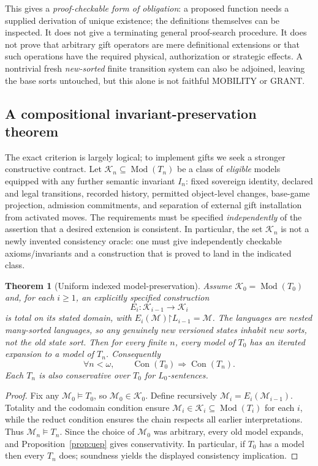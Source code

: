 \documentclass[11pt,letterpaper]{article}
\newtheorem{theorem}{Theorem}[section]
\theoremstyle{definition}
\newcommand{\Con}{\operatorname{Con}}
\newcommand{\Mod}{\operatorname{Mod}}
\newcommand{\restr}{\mathord{\upharpoonright}}
\begin{document}
\noindent This gives a \emph{proof-checkable form of obligation}: a proposed function needs a supplied derivation of unique existence; the definitions themselves can be inspected. It does not give a terminating general proof-search procedure. It does not prove that arbitrary gift operators are mere definitional extensions or that such operations have the required physical, authorization or strategic effects. A nontrivial fresh \emph{new-sorted} finite transition system can also be adjoined, leaving the base sorts untouched, but this alone is not faithful MOBILITY or GRANT.

\subsection{A compositional invariant-preservation theorem}

The exact criterion is largely logical; to implement gifts we seek a stronger constructive contract. Let \(\mathcal K_n\subseteq\Mod(T_n)\) be a class of \emph{eligible} models equipped with any further semantic invariant \(I_n\): fixed sovereign identity, declared and legal transitions, recorded history, permitted object-level changes, base-game projection, admission commitments, and separation of external gift installation from activated moves. The requirements must be specified \emph{independently} of the assertion that a desired extension is consistent. In particular, the set $\mathcal K_n$ is not a newly invented consistency oracle: one must give independently checkable axioms/invariants and a construction that is proved to land in the indicated class.

\begin{theorem}[Uniform indexed model-preservation]\label{thm:indexed}
Assume \(\mathcal K_0=\Mod(T_0)\) and, for each \(i\geq1\), an explicitly specified construction
\[
E_i:\mathcal K_{i-1}\longrightarrow\mathcal K_i
\]
is total on its stated domain, with \(E_i(\mathcal M)\restr L_{i-1}=\mathcal M\). The languages are nested many-sorted languages, so any genuinely new versioned states inhabit new sorts, not the old state sort. Then for every finite \(n\), every model of \(T_0\) has an iterated expansion to a model of \(T_n\). Consequently
\begin{equation}\label{eq:result}
\forall n<\omega,\qquad
\Con(T_0)\Longrightarrow\Con(T_n).
\end{equation}
Each \(T_n\) is also conservative over \(T_0\) for \(L_0\)-sentences.
\end{theorem}
\begin{proof}
Fix any \(\mathcal M_0\models T_0\), so \(\mathcal M_0\in\mathcal K_0\). Define recursively \(\mathcal M_i=E_i(\mathcal M_{i-1})\). Totality and the codomain condition ensure \(\mathcal M_i\in\mathcal K_i\subseteq\Mod(T_i)\) for each \(i\), while the reduct condition ensures the chain respects all earlier interpretations. Thus \(\mathcal M_n\models T_n\). Since the choice of \(\mathcal M_0\) was arbitrary, every old model expands, and Proposition~\ref{prop:uep} gives conservativity. In particular, if \(T_0\) has a model then every \(T_n\) does; soundness yields the displayed consistency implication.
\end{proof}
\end{document}
